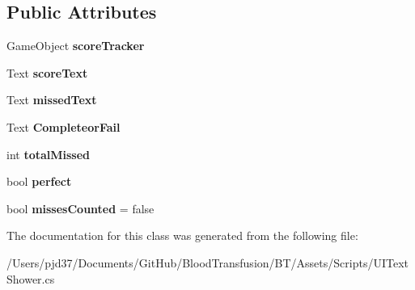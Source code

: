 \subsection*{Public Attributes}
\begin{DoxyCompactItemize}
\item 
Game\+Object {\bfseries score\+Tracker}\hypertarget{class_u_i_text_shower_a8ec0ed66ce210b208270d66311059980}{}\label{class_u_i_text_shower_a8ec0ed66ce210b208270d66311059980}

\item 
Text {\bfseries score\+Text}\hypertarget{class_u_i_text_shower_abc56e127fc59d3c3682684269a1a9a20}{}\label{class_u_i_text_shower_abc56e127fc59d3c3682684269a1a9a20}

\item 
Text {\bfseries missed\+Text}\hypertarget{class_u_i_text_shower_a214a59b4e326356974fcb7b0171a517e}{}\label{class_u_i_text_shower_a214a59b4e326356974fcb7b0171a517e}

\item 
Text {\bfseries Completeor\+Fail}\hypertarget{class_u_i_text_shower_aa8e572ce78aca659cbfa3292c6352a9a}{}\label{class_u_i_text_shower_aa8e572ce78aca659cbfa3292c6352a9a}

\item 
int {\bfseries total\+Missed}\hypertarget{class_u_i_text_shower_a6b7b3e1af2ab51865e23076fb9f347f3}{}\label{class_u_i_text_shower_a6b7b3e1af2ab51865e23076fb9f347f3}

\item 
bool {\bfseries perfect}\hypertarget{class_u_i_text_shower_aea6e1d3c2b0986a30ac759835764815f}{}\label{class_u_i_text_shower_aea6e1d3c2b0986a30ac759835764815f}

\item 
bool {\bfseries misses\+Counted} = false\hypertarget{class_u_i_text_shower_aa94eebeeb45a7556139e7a190d51909b}{}\label{class_u_i_text_shower_aa94eebeeb45a7556139e7a190d51909b}

\end{DoxyCompactItemize}


The documentation for this class was generated from the following file\+:\begin{DoxyCompactItemize}
\item 
/\+Users/pjd37/\+Documents/\+Git\+Hub/\+Blood\+Transfusion/\+B\+T/\+Assets/\+Scripts/U\+I\+Text\+Shower.\+cs\end{DoxyCompactItemize}
